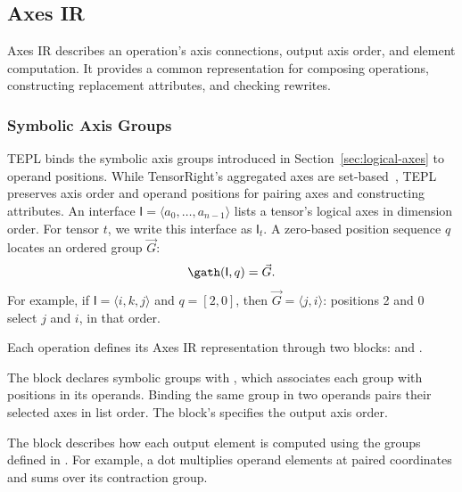 \subsection{Axes IR}
\label{sec:axes-ir}
Axes IR describes an operation's axis connections, output axis order,
and element computation. It provides a common representation for composing
operations, constructing replacement attributes, and checking rewrites.

\subsubsection{Symbolic Axis Groups}
\label{sec:axis-groups}
TEPL binds the symbolic axis groups introduced in
Section~\ref{sec:logical-axes} to operand positions.
While TensorRight's aggregated axes are set-based~\cite{tensorright},
TEPL preserves axis order and operand positions for pairing axes and
constructing attributes. An interface
$\mathsf{I}=\langle a_0,\ldots,a_{n-1}\rangle$ lists a tensor's logical axes in dimension
order. For tensor $t$, we write this interface as $\mathsf{I}_t$.
A zero-based position sequence $q$ locates an ordered group $\vec G$:
\begin{equation}
 \gath(\mathsf{I},q)=\vec G.
 \label{eq:mapping}
\end{equation}
For example, if $\mathsf{I}=\langle i,k,j\rangle$ and $q=[2,0]$,
then $\vec G=\langle j,i\rangle$: positions 2 and 0 select $j$ and $i$,
in that order.


Each operation defines its Axes IR representation through two blocks:
 and .

The  block declares symbolic groups with , which
associates each group with positions in its operands. Binding the same
group in two operands pairs their selected axes in list order.
The block's  specifies the output axis order.

The  block describes how each output element is computed
using the groups defined in . For example, a dot multiplies
operand elements at paired coordinates and sums over its contraction group.

